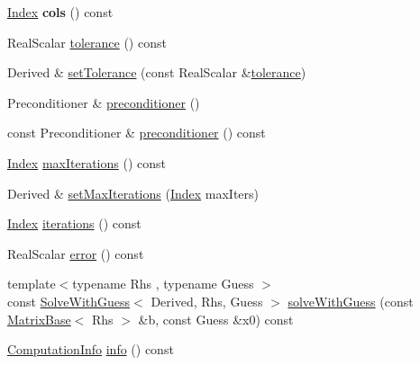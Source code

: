 \begin{DoxyCompactItemize}
\hyperlink{namespace_eigen_a62e77e0933482dafde8fe197d9a2cfde}{Index} {\bfseries cols} () const
\item 
Real\+Scalar \hyperlink{group___iterative_linear_solvers___module_acb442c19b5858d6b9be813dd7d36cc62}{tolerance} () const
\item 
Derived \& \hyperlink{group___iterative_linear_solvers___module_ac160a444af8998f93da9aa30e858470d}{set\+Tolerance} (const Real\+Scalar \&\hyperlink{group___iterative_linear_solvers___module_acb442c19b5858d6b9be813dd7d36cc62}{tolerance})
\item 
Preconditioner \& \hyperlink{group___iterative_linear_solvers___module_a5e88f2a323a2900205cf807af94f8051}{preconditioner} ()
\item 
const Preconditioner \& \hyperlink{group___iterative_linear_solvers___module_a709a056e17c49b5272e4971bc376cbe4}{preconditioner} () const
\item 
\hyperlink{namespace_eigen_a62e77e0933482dafde8fe197d9a2cfde}{Index} \hyperlink{group___iterative_linear_solvers___module_a168a74c8dceb6233b220031fdd756ba0}{max\+Iterations} () const
\item 
Derived \& \hyperlink{group___iterative_linear_solvers___module_af83de7a7d31d9d4bd1fef6222b07335b}{set\+Max\+Iterations} (\hyperlink{namespace_eigen_a62e77e0933482dafde8fe197d9a2cfde}{Index} max\+Iters)
\item 
\hyperlink{namespace_eigen_a62e77e0933482dafde8fe197d9a2cfde}{Index} \hyperlink{group___iterative_linear_solvers___module_ae778dd098bd5e6655625b20b1e9f15da}{iterations} () const
\item 
Real\+Scalar \hyperlink{group___iterative_linear_solvers___module_a117c241af3fb1141ad0916a3cf3157ec}{error} () const
\item 
{\footnotesize template$<$typename Rhs , typename Guess $>$ }\\const \hyperlink{group___iterative_linear_solvers___module_class_eigen_1_1_solve_with_guess}{Solve\+With\+Guess}$<$ Derived, Rhs, Guess $>$ \hyperlink{group___iterative_linear_solvers___module_adcc18d1ab283786dcbb5a3f63f4b4bd8}{solve\+With\+Guess} (const \hyperlink{group___core___module_class_eigen_1_1_matrix_base}{Matrix\+Base}$<$ Rhs $>$ \&b, const Guess \&x0) const
\item 
\hyperlink{group__enums_ga85fad7b87587764e5cf6b513a9e0ee5e}{Computation\+Info} \hyperlink{group___iterative_linear_solvers___module_a0d6b459433a316b4f12d48e5c80d61fe}{info} () const
\item 
\mbox{\label{group___iterative_linear_solvers___module_a7c2a35dde0ddb891b4030143ed286743}} 

\end{DoxyCompactItemize}
